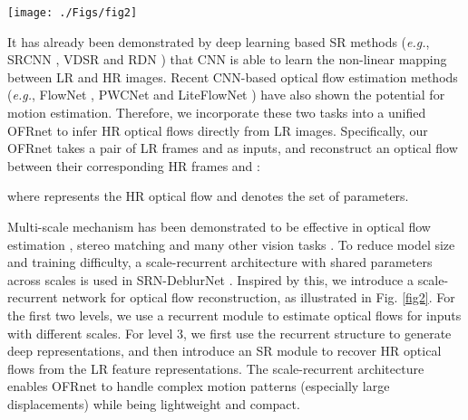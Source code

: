 \documentclass[journal]{IEEEtran}
\begin{document}
	\begin{figure*}[ht]
		\centering
		\texttt{[image: ./Figs/fig2]}
		\caption{\textcolor{black}{The architecture of our OFRnet. Our OFRnet works in a coarse-to-fine manner. At each level, the output of its previous level is used to generate a residual optical flow.}}
		\label{fig2}
	\end{figure*}
	
	It has already been demonstrated by deep learning based SR methods (\emph{e.g.}, SRCNN \cite{2014-LearningaDeepConvolutionalNetworkforImageSuperResolution-Dong-184-199}, VDSR \cite{2016-AccurateImageSuperResolutionUsingVeryDeepConvolutionalNetworks-Kim-1646-1654} and RDN \cite{2018-ResidualDenseNetworkforImageSuperResolution-Zhang--})  that CNN is able to learn the non-linear mapping between LR and HR images. Recent CNN-based optical flow estimation methods (\emph{e.g.}, FlowNet \cite{2015-FlowNet:LearningOpticalFlowwithConvolutionalNetworks-Dosovitskiy-2758-2766}, PWCNet \cite{2017-PWCNet:CNNsforOpticalFlowUsingPyramidWarpingandCostVolume-Sun--} and LiteFlowNet \cite{2018-LiteFlowNet:aLightweightConvolutionalNeuralNetworkforOpticalFlowEstimation-Hui--}) have also shown the potential for motion estimation. Therefore, we incorporate these two tasks into a unified OFRnet to infer HR optical flows directly from LR images. Specifically, our OFRnet takes a pair of LR frames  and 
	as inputs, and reconstruct an optical flow  between their corresponding
	HR frames  and :
	
	
	where  represents the HR optical flow and  denotes
	the set of parameters.
	
	Multi-scale mechanism has been demonstrated to be effective in optical flow estimation \cite{2017-OpticalFlowEstimationUsingaSpatialPyramidNetwork-Ranjan-2720-2729,2018-LiteFlowNet:aLightweightConvolutionalNeuralNetworkforOpticalFlowEstimation-Hui--}, stereo matching \cite{2017-EndtoEndLearningofGeometryandContextforDeepStereoRegression-Kendall-66-75,2018-PyramidStereoMatchingNetwork-Chang--} and many other vision tasks \cite{2018-ScaleRecurrentNetworkforDeepImageDeblurring-Tao--}. To reduce model size and training difficulty, a scale-recurrent architecture with shared parameters across scales is used in SRN-DeblurNet \cite{2018-ScaleRecurrentNetworkforDeepImageDeblurring-Tao--}. Inspired by this, we introduce a scale-recurrent network for optical flow reconstruction, as illustrated in Fig. \ref{fig2}. For the first two levels, we use a recurrent module to estimate optical flows for inputs with different scales. For level 3, we first use the recurrent structure to generate deep representations, and then introduce an SR module to recover HR optical flows from the LR feature representations. The scale-recurrent architecture enables  OFRnet to handle complex motion patterns (especially large displacements) while being lightweight and compact.
	
\end{document}
